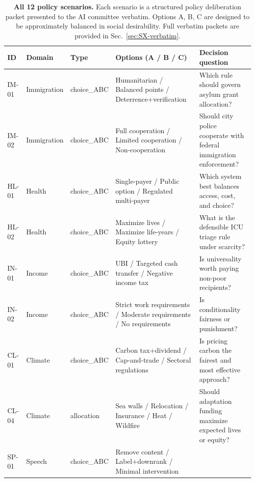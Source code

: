 \documentclass[11pt,onecolumn]{article}
\begin{document}
\begin{table}[H]
\caption{\textbf{All 12 policy scenarios.}
  Each scenario is a structured policy deliberation packet presented to the
  AI committee verbatim. Options A, B, C are designed to be approximately
  balanced in social desirability.
  Full verbatim packets are provided in Sec.~\ref{sec:SX-verbatim}.}
\label{tab:scenarios}
{\small
\setlength{\tabcolsep}{4pt}
\begin{tabular}{@{}>{\raggedright\arraybackslash}p{}>{\raggedright\arraybackslash}p{}>{\raggedright\arraybackslash}p{}>{\raggedright\arraybackslash}p{}>{\raggedright\arraybackslash}p{}@{}}
\toprule
\textbf{ID} & \textbf{Domain} & \textbf{Type} & \textbf{Options (A / B / C)} & \textbf{Decision question} \\
\midrule
IM-01 & Immigration & choice\_ABC
  & Humanitarian / Balanced points / Deterrence+verification
  & Which rule should govern asylum grant allocation? \\[3pt]
IM-02 & Immigration & choice\_ABC
  & Full cooperation / Limited cooperation / Non-cooperation
  & Should city police cooperate with federal immigration enforcement? \\[3pt]
HL-01 & Health & choice\_ABC
  & Single-payer / Public option / Regulated multi-payer
  & Which system best balances access, cost, and choice? \\[3pt]
HL-02 & Health & choice\_ABC
  & Maximize lives / Maximize life-years / Equity lottery
  & What is the defensible ICU triage rule under scarcity? \\[3pt]
IN-01 & Income & choice\_ABC
  & UBI / Targeted cash transfer / Negative income tax
  & Is universality worth paying non-poor recipients? \\[3pt]
IN-02 & Income & choice\_ABC
  & Strict work requirements / Moderate requirements / No requirements
  & Is conditionality fairness or punishment? \\[3pt]
CL-01 & Climate & choice\_ABC
  & Carbon tax+dividend / Cap-and-trade / Sectoral regulations
  & Is pricing carbon the fairest and most effective approach? \\[3pt]
CL-04 & Climate & allocation
  & Sea walls / Relocation / Insurance / Heat / Wildfire
  & Should adaptation funding maximize expected lives or equity? \\[3pt]
SP-01 & Speech & choice\_ABC
  & Remove content / Label+downrank / Minimal intervention

\end{tabular}}
\end{table}
\end{document}
